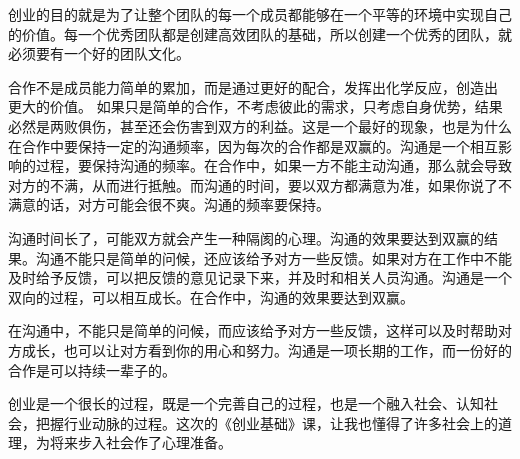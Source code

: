 \documentclass[UTF8]{article}
\begin{document}
创业的目的就是为了让整个团队的每一个成员都能够在一个平等的环境中实现自己的价值。每一个优秀团队都是创建高效团队的基础，所以创建一个优秀的团队，就必须要有一个好的团队文化。

合作不是成员能力简单的累加，而是通过更好的配合，发挥出化学反应，创造出
更大的价值。  如果只是简单的合作，不考虑彼此的需求，只考虑自身优势，结果必然是两败俱伤，甚至还会伤害到双方的利益。这是一个最好的现象，也是为什么在合作中要保持一定的沟通频率，因为每次的合作都是双赢的。沟通是一个相互影响的过程，要保持沟通的频率。在合作中，如果一方不能主动沟通，那么就会导致对方的不满，从而进行抵触。而沟通的时间，要以双方都满意为准，如果你说了不满意的话，对方可能会很不爽。沟通的频率要保持。

沟通时间长了，可能双方就会产生一种隔阂的心理。沟通的效果要达到双赢的结果。沟通不能只是简单的问候，还应该给予对方一些反馈。如果对方在工作中不能及时给予反馈，可以把反馈的意见记录下来，并及时和相关人员沟通。沟通是一个双向的过程，可以相互成长。在合作中，沟通的效果要达到双赢。

在沟通中，不能只是简单的问候，而应该给予对方一些反馈，这样可以及时帮助对方成长，也可以让对方看到你的用心和努力。沟通是一项长期的工作，而一份好的合作是可以持续一辈子的。

创业是一个很长的过程，既是一个完善自己的过程，也是一个融入社会、认知社会，把握行业动脉的过程。这次的《创业基础》课，让我也懂得了许多社会上的道理，为将来步入社会作了心理准备。
\end{document}
